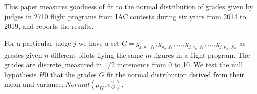 This paper measures goodness of fit to the normal distribution of
grades given by judges in 2710 flight programs from IAC contests
during six years from 2014 to 2019, and reports the results.

For a particular judge $j$ we have a set
$G = g_{j,p_1,f_1}, g_{p_2,f_1}, ..., g_{j,p_n,f_1}, ..., g_{j,p_n,f_m}$
as grades given $n$ different pilots flying the same $m$ figures
in a flight program. The grades are discrete, measured in $1/2$
increments from 0 to 10.  We test the null hypothesis $H0$ that the grades
$G$ fit
the normal distribution derived from their mean and variance,
$Normal(\mu_G, \sigma^2_G)$.
